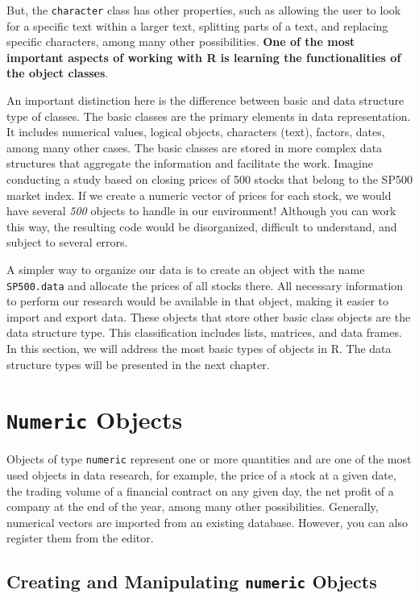 \documentclass[11pt,]{book}
\begin{document}
But, the \texttt{character} class has other properties, such as allowing
the user to look for a specific text within a larger text, splitting
parts of a text, and replacing specific characters, among many other
possibilities. \textbf{One of the most important aspects of working with
R is learning the functionalities of the object classes}.

An important distinction here is the difference between basic and data
structure type of classes. The basic classes are the primary elements in
data representation. It includes numerical values, logical objects,
characters (text), factors, dates, among many other cases. The basic
classes are stored in more complex data structures that aggregate the
information and facilitate the work. Imagine conducting a study based on
closing prices of 500 stocks that belong to the SP500 market index. If
we create a numeric vector of prices for each stock, we would have
several \emph{500} objects to handle in our environment! Although you
can work this way, the resulting code would be disorganized, difficult
to understand, and subject to several errors.

A simpler way to organize our data is to create an object with the name
\texttt{SP500.data} and allocate the prices of all stocks there. All
necessary information to perform our research would be available in that
object, making it easier to import and export data. These objects that
store other basic class objects are the data structure type. This
classification includes lists, matrices, and data frames. In this
section, we will address the most basic types of objects in R. The data
structure types will be presented in the next chapter.

\section{\texorpdfstring{\texttt{Numeric}
Objects}{Numeric Objects}}\label{numeric-objects}

Objects of type \texttt{numeric} represent one or more quantities and
are one of the most used objects in data research, for example, the
price of a stock at a given date, the trading volume of a financial
contract on any given day, the net profit of a company at the end of the
year, among many other possibilities. Generally, numerical vectors are
imported from an existing database. However, you can also register them
from the editor. 

\subsection{\texorpdfstring{Creating and Manipulating \texttt{numeric}
Objects}{Creating and Manipulating numeric Objects}}\label{creating-and-manipulating-numeric-objects}
\end{document}

